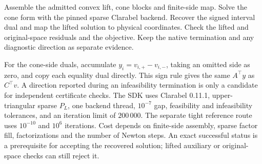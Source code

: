 \begin{algorithm}[ht]
\caption{Lift, solve and check the Clarabel candidate}\label{alg:clarabel-route}
\begin{algorithmic}[1]
\State Assemble the admitted convex lift, cone blocks and finite-side map.
\State Solve the cone form with the pinned sparse Clarabel backend.
 \State Recover the signed interval dual and map the lifted solution to physical coordinates.
 \State Check the lifted and original-space residuals and the objective.
\Else
 \State Keep the native termination and any diagnostic direction as separate evidence.
\EndIf
\end{algorithmic}
\end{algorithm}

For the cone-side duals, accumulate \(y_i=v_{i,+}-v_{i,-}\), taking an
omitted side as zero, and copy each equality dual directly. This sign
rule gives the same \(A^\top y\) as \(C^\top v\). A direction reported
during an infeasibility termination is only a candidate for independent
certificate checks. The SDK uses Clarabel 0.11.1, upper-triangular sparse
\(P_L\), one backend thread, \(10^{-7}\) gap, feasibility and
infeasibility tolerances, and an iteration limit of \(200\,000\).
The separate tight reference route uses \(10^{-10}\) and \(10^6\)
iterations. Cost depends on finite-side assembly, sparse factor fill,
factorizations and the number of Newton steps. An exact successful
status is a prerequisite for accepting the recovered solution; lifted
auxiliary or original-space checks can still reject it.
